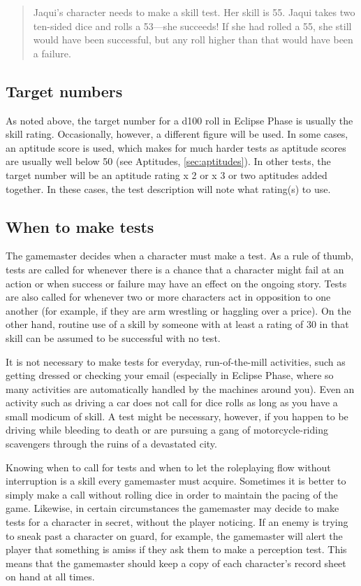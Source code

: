\begin{quotation}
  Jaqui's character needs to make a skill test. Her skill is 55. Jaqui
  takes two ten-sided dice and rolls a 53—she succeeds! If she had
  rolled a 55, she still would have been successful, but any roll
  higher than that would have been a failure.
\end{quotation}

\subsection{Target numbers}
\label{sec:target-numbers}

As noted above, the target number for a d100 roll in Eclipse Phase is
usually the skill rating. Occasionally, however, a different figure
will be used. In some cases, an aptitude score is used, which makes
for much harder tests as aptitude scores are usually well below 50
(see Aptitudes, \ref{sec:aptitudes}). In other tests, the target
number will be an aptitude rating x 2 or x 3 or two aptitudes added
together. In these cases, the test description will note what
rating(s) to use.

\subsection{When to make tests}
\label{sec:when-make-tests}

The gamemaster decides when a character must make a test. As a rule of
thumb, tests are called for whenever there is a chance that a
character might fail at an action or when success or failure may have
an effect on the ongoing story. Tests are also called for whenever two
or more characters act in opposition to one another (for example, if
they are arm wrestling or haggling over a price). On the other hand,
routine use of a skill by someone with at least a rating of 30 in that
skill can be assumed to be successful with no test.

It is not necessary to make tests for everyday, run-of-the-mill
activities, such as getting dressed or checking your email (especially
in Eclipse Phase, where so many activities are automatically handled
by the machines around you). Even an activity such as driving a car
does not call for dice rolls as long as you have a small modicum of
skill. A test might be necessary, however, if you happen to be driving
while bleeding to death or are pursuing a gang of motorcycle-riding
scavengers through the ruins of a devastated city.

Knowing when to call for tests and when to let the roleplaying flow
without interruption is a skill every gamemaster must
acquire. Sometimes it is better to simply make a call without rolling
dice in order to maintain the pacing of the game. Likewise, in certain
circumstances the gamemaster may decide to make tests for a character
in secret, without the player noticing. If an enemy is trying to sneak
past a character on guard, for example, the gamemaster will alert the
player that something is amiss if they ask them to make a perception
test. This means that the gamemaster should keep a copy of each
character's record sheet on hand at all times.

